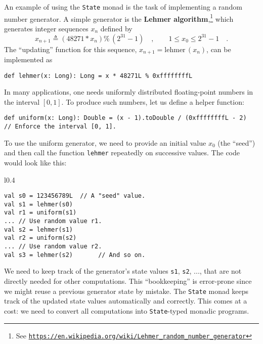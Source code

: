 An example of using the \lstinline!State! monad is the task of implementing
a random number generator. A simple generator is the \textbf{Lehmer
algorithm},\footnote{See \texttt{\href{https://en.wikipedia.org/wiki/Lehmer_random_number_generator}{https://en.wikipedia.org/wiki/Lehmer\_random\_number\_generator}}}
which generates integer sequences $x_{n}$ defined by
\[
x_{n+1}\triangleq\left(48271*x_{n}\right)\%\,(2^{31}-1)\quad,\quad\quad1\leq x_{0}\leq2^{31}-1\quad.
\]
The \textsf{``}updating\textsf{''} function for this sequence, $x_{n+1}=\text{lehmer}\,(x_{n})$,
can be implemented as 
\begin{lstlisting}
def lehmer(x: Long): Long = x * 48271L % 0xffffffffL
\end{lstlisting}
In many applications, one needs uniformly distributed floating-point
numbers in the interval $\left[0,1\right]$. To produce such numbers,
let us define a helper function:
\begin{lstlisting}
def uniform(x: Long): Double = (x - 1).toDouble / (0xffffffffL - 2)   // Enforce the interval [0, 1].
\end{lstlisting}

To use the uniform generator, we need to provide an initial value
$x_{0}$ (the \textsf{``}seed\textsf{''}) and then call the function \lstinline!lehmer!
repeatedly on successive values. The code would look like this:

\begin{wrapfigure}{l}{0.4\columnwidth}%
\vspace{-0.8\baselineskip}
\begin{lstlisting}
val s0 = 123456789L  // A "seed" value.
val s1 = lehmer(s0)
val r1 = uniform(s1)
... // Use random value r1.
val s2 = lehmer(s1)
val r2 = uniform(s2)
... // Use random value r2.
val s3 = lehmer(s2)       // And so on.
\end{lstlisting}

\vspace{-1\baselineskip}
\end{wrapfigure}%

\noindent We need to keep track of the generator\textsf{'}s state values \lstinline!s1!,
\lstinline!s2!, ..., that are not directly needed for other computations.
This \textsf{``}bookkeeping\textsf{''} is error-prone since we might reuse a previous
generator state by mistake. The \lstinline!State! monad keeps track
of the updated state values automatically and correctly. This comes
at a cost: we need to convert all computations into \lstinline!State!-typed
monadic programs.

